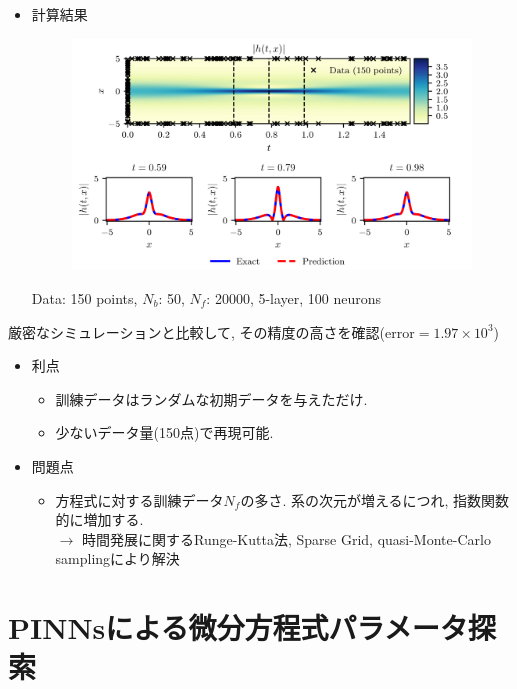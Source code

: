 \documentclass[xcolor=dvipsnames,hyperref={breaklinks=true},mathserif,professionalfont,dvipdfmx,12pt]{beamer}
\begin{document}
\begin{frame}
  \begin{itemize}
    \item 計算結果
    \begin{figure}[H]
      \centering
        \includegraphics[width=0.9\linewidth]{figure/fig3.png}
    \end{figure}
    \tiny
    Data: 150 points, $N_b$: 50, $N_f$: 20000, 5-layer, 100 neurons
    \normalsize
  \end{itemize}
  \scriptsize
    厳密なシミュレーションと比較して, その精度の高さを確認($\mathrm{error}=1.97\times10^3$)
    \normalsize
\end{frame}
\begin{frame}
  \begin{itemize}
  \item 利点
  \begin{itemize}
    \item 訓練データはランダムな初期データを与えただけ.
    \item 少ないデータ量(150点)で再現可能.
  \end{itemize}
  \item 問題点
  \begin{itemize}
    \item 方程式に対する訓練データ$N_f$の多さ. 系の次元が増えるにつれ, 指数関数的に増加する.\\
    $\longrightarrow$ \quad 時間発展に関するRunge-Kutta法, Sparse Grid, quasi-Monte-Carlo samplingにより解決
  \end{itemize}
  \end{itemize}
\end{frame}

\section{PINNsによる微分方程式パラメータ探索}
\end{document}
